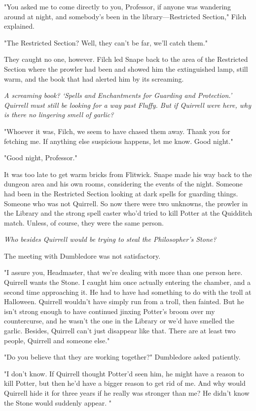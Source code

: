 "You asked me to come directly to you, Professor, if anyone was wandering around at night, and somebody's been in the library—Restricted Section," Filch explained.

"The Restricted Section? Well, they can't be far, we'll catch them."

They caught no one, however. Filch led Snape back to the area of the Restricted Section where the prowler had been and showed him the extinguished lamp, still warm, and the book that had alerted him by its screaming.

\emph{A screaming book? `Spells and Enchantments for Guarding and Protection.' Quirrell must still be looking for a way past Fluffy. But if Quirrell were here, why is there no lingering smell of garlic?}

"Whoever it was, Filch, we seem to have chased them away. Thank you for fetching me. If anything else suspicious happens, let me know. Good night."

"Good night, Professor."

It was too late to get warm bricks from Flitwick. Snape made his way back to the dungeon area and his own rooms, considering the events of the night. Someone had been in the Restricted Section looking at dark spells for guarding things. Someone who was not Quirrell. So now there were two unknowns, the prowler in the Library and the strong spell caster who'd tried to kill Potter at the Quidditch match. Unless, of course, they were the same person.

\emph{Who besides Quirrell would be trying to steal the Philosopher's Stone?}

The meeting with Dumbledore was not satisfactory.

"I assure you, Headmaster, that we're dealing with more than one person here. Quirrell wants the Stone. I caught him once actually entering the chamber, and a second time approaching it. He had to have had something to do with the troll at Halloween. Quirrell wouldn't have simply run from a troll, then fainted. But he isn't strong enough to have continued jinxing Potter's broom over my countercurse, and he wasn't the one in the Library or we'd have smelled the garlic. Besides, Quirrell can't just disappear like that. There are at least two people, Quirrell and someone else."

"Do you believe that they are working together?" Dumbledore asked patiently.

"I don't know. If Quirrell thought Potter'd seen him, he might have a reason to kill Potter, but then he'd have a bigger reason to get rid of me. And why would Quirrell hide it for three years if he really was stronger than me? He didn't know the Stone would suddenly appear. "

